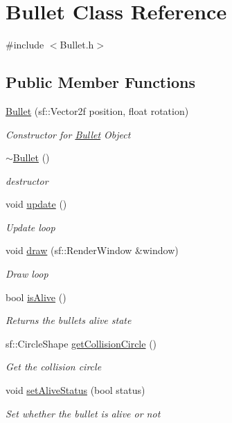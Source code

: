 \hypertarget{class_bullet}{}\section{Bullet Class Reference}
\label{class_bullet}


{\ttfamily \#include $<$Bullet.\+h$>$}

\subsection*{Public Member Functions}
\begin{DoxyCompactItemize}
\item 
\mbox{\hyperlink{class_bullet_aaa125020f55e7d86e6c46212f412f15d}{Bullet}} (sf\+::\+Vector2f position, float rotation)
\begin{DoxyCompactList}\small\item\em Constructor for \mbox{\hyperlink{class_bullet}{Bullet}} Object \end{DoxyCompactList}\item 
\mbox{\hyperlink{class_bullet_aaeb5cb41d7db89f49007b08b41f1bfcf}{$\sim$\+Bullet}} ()
\begin{DoxyCompactList}\small\item\em destructor \end{DoxyCompactList}\item 
void \mbox{\hyperlink{class_bullet_a32f4a0611fe2dd245fee955d14ca1f68}{update}} ()
\begin{DoxyCompactList}\small\item\em Update loop \end{DoxyCompactList}\item 
void \mbox{\hyperlink{class_bullet_aa128a7449171a208a057a73a19ec2837}{draw}} (sf\+::\+Render\+Window \&window)
\begin{DoxyCompactList}\small\item\em Draw loop \end{DoxyCompactList}\item 
bool \mbox{\hyperlink{class_bullet_ae23f1f04ccd644d823184feb0da3c6b2}{is\+Alive}} ()
\begin{DoxyCompactList}\small\item\em Returns the bullets alive state \end{DoxyCompactList}\item 
sf\+::\+Circle\+Shape \mbox{\hyperlink{class_bullet_a62f499c863d9a0801a0ac7661e4bdf14}{get\+Collision\+Circle}} ()
\begin{DoxyCompactList}\small\item\em Get the collision circle \end{DoxyCompactList}\item 
void \mbox{\hyperlink{class_bullet_a502360f46d88c3640d022bffd5b99db5}{set\+Alive\+Status}} (bool status)
\begin{DoxyCompactList}\small\item\em Set whether the bullet is alive or not \end{DoxyCompactList}\end{DoxyCompactItemize}


